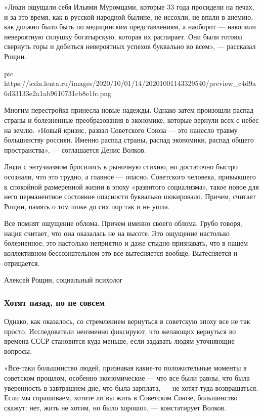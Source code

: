 «Люди ощущали себя Ильями Муромцами, которые 33 года просидели на печах, и за
это время, как в русской народной былине, не иссохли, не впали в анемию, как
должно было быть по медицинским представлениям, а наоборот — накопили
невероятную силушку богатырскую, которая их распирает. Они были готовы свернуть
горы и добиться невероятных успехов буквально во всем», — рассказал Рощин.

\ifcmt
pic https://icdn.lenta.ru/images/2020/10/01/14/20201001143329540/preview_c4d9a6d33133e2a1ab9610731cb8e1fc.png
\fi

Многим перестройка принесла новые надежды. Однако затем произошли распад страны
и болезненные преобразования в экономике, которые вернули всех с небес на
землю. «Новый кризис, развал Советского Союза — это нанесло травму большинству
россиян. Именно распад страны, распад экономики, распад общего пространства», —
соглашается Денис Волков.

Люди с энтузиазмом бросились в рыночную стихию, но достаточно быстро осознали,
что это трудно, а главное — опасно. Советского человека, привыкшего к спокойной
размеренной жизни в эпоху «развитого социализма», такое новое для него
перманентное состояние опасности буквально шокировало. Причем, считает Рощин,
память о том шоке до сих пор так и не ушла.

Все помнят ощущение облома. Причем именно своего облома. Грубо говоря, нация
считает, что она оказалась не на высоте. Это ощущение настолько болезненное,
это настолько неприятно и даже стыдно признавать, что в нашем коллективном
бессознательном это все вытесняется вообще. Вытесняется и отрицается.

Алексей Рощин, социальный психолог

\subsubsection{Хотят назад, но не совсем}

Однако, как оказалось, со стремлением вернуться в советскую эпоху все не так
просто. Исследователи неизменно фиксируют, что желающих вернуться во времена
СССР становится куда меньше, если задавать людям уточняющие вопросы.

«Все-таки большинство людей, признавая какие-то положительные моменты в
советском прошлом, особенно экономические — что все были равны, что была
уверенность в завтрашнем дне, что была зарплата, — не хотят туда возвращаться.
Если мы спрашиваем, хотите ли вы жить в Советском Союзе, большинство скажут:
нет, жить не хотим, но было хорошо», — констатирует Волков.

